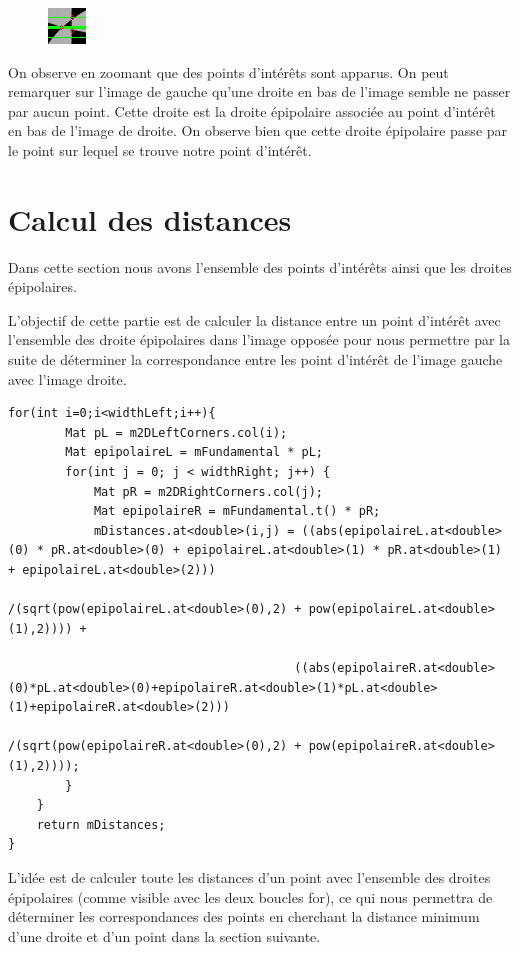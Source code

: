 \documentclass[a4paper,12pt]{report}
\begin{document}
\begin{figure}[!ht]
	\center
	\includegraphics[scale=1]{./image/corner.png}
\end{figure}

On observe en zoomant que des points d'intérêts sont apparus. On peut remarquer sur l'image de gauche qu'une droite en bas de l'image semble ne passer par aucun point. Cette droite est la droite épipolaire associée au point d'intérêt en bas de l'image de droite. On observe bien que cette droite épipolaire passe par le point sur lequel se trouve notre point d'intérêt.

\newpage
\section*{Calcul des distances}

Dans cette section nous avons l'ensemble des points d'intérêts ainsi que les droites épipolaires.

L'objectif de cette partie est de calculer la distance entre un point d'intérêt avec l'ensemble des droite épipolaires dans l'image opposée pour nous permettre par la suite de déterminer la correspondance entre les point d'intérêt de l'image gauche avec l'image droite.

\begin{lstlisting}[style=C++]
 for(int i=0;i<widthLeft;i++){
        Mat pL = m2DLeftCorners.col(i);
        Mat epipolaireL = mFundamental * pL;
        for(int j = 0; j < widthRight; j++) {
            Mat pR = m2DRightCorners.col(j);
            Mat epipolaireR = mFundamental.t() * pR;
            mDistances.at<double>(i,j) = ((abs(epipolaireL.at<double>(0) * pR.at<double>(0) + epipolaireL.at<double>(1) * pR.at<double>(1) + epipolaireL.at<double>(2)))
                                          /(sqrt(pow(epipolaireL.at<double>(0),2) + pow(epipolaireL.at<double>(1),2)))) +

                                        ((abs(epipolaireR.at<double>(0)*pL.at<double>(0)+epipolaireR.at<double>(1)*pL.at<double>(1)+epipolaireR.at<double>(2)))
                                        /(sqrt(pow(epipolaireR.at<double>(0),2) + pow(epipolaireR.at<double>(1),2))));
        }
    }
    return mDistances;
}
\end{lstlisting}

L'idée est de calculer toute les distances d'un point avec l'ensemble des droites épipolaires (comme visible avec les deux boucles for), ce qui nous permettra de déterminer les correspondances des points en cherchant la distance minimum d'une droite et d'un point dans la section suivante.
\end{document}
